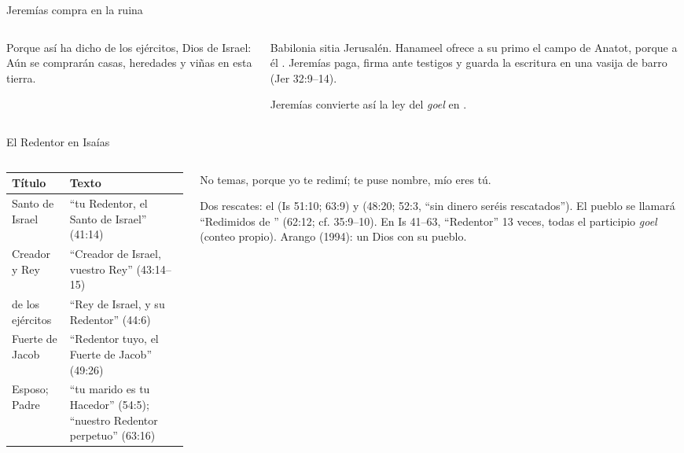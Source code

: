 \begin{frame}{Jeremías compra en la ruina}
\begin{columns}[c,onlytextwidth]
\begin{column}{0.52\textwidth}
\begin{cita}Porque así ha dicho \SENOR{} de los ejércitos, Dios de Israel: Aún se comprarán casas, heredades y viñas en esta tierra.\end{cita}
\end{column}
\begin{column}{0.45\textwidth}\small\RaggedRight
Babilonia sitia Jerusalén. Hanameel ofrece a su primo el campo de Anatot, porque a él . Jeremías paga, firma ante testigos y guarda la escritura en una vasija de barro (Jer 32:9--14).\par\medskip
Jeremías convierte así la ley del \emph{goel} en .
\end{column}
\end{columns}
\end{frame}

\begin{frame}{El Redentor en Isaías}
\begin{columns}[t,onlytextwidth]
\begin{column}{0.53\textwidth}\scriptsize\renewcommand{\arraystretch}{1.12}
\begin{tabular}{@{}L{2.1cm}L{4.1cm}@{}}
\toprule
\textbf{Título} & \textbf{Texto} \\ \midrule
Santo de Israel & ``tu Redentor, el Santo de Israel'' (41:14) \\
Creador y Rey & ``Creador de Israel, vuestro Rey'' (43:14--15) \\
\SENOR{} de los ejércitos & ``Rey de Israel, y su Redentor'' (44:6) \\
Fuerte de Jacob & ``Redentor tuyo, el Fuerte de Jacob'' (49:26) \\
Esposo; Padre & ``tu marido es tu Hacedor'' (54:5); ``nuestro Redentor perpetuo'' (63:16) \\
\bottomrule
\end{tabular}
\end{column}
\begin{column}{0.45\textwidth}
\begin{cita}No temas, porque yo te redimí; te puse nombre, mío eres tú.\end{cita}
\scriptsize\RaggedRight Dos rescates: el  (Is 51:10; 63:9) y  (48:20; 52:3, ``sin dinero seréis rescatados''). El pueblo se llamará ``Redimidos de \SENOR'' (62:12; cf. 35:9--10). En Is 41--63, ``Redentor'' 13 veces, todas el participio \emph{goel} (conteo propio). Arango (1994): un Dios  con su pueblo.
\end{column}
\end{columns}
\end{frame}

